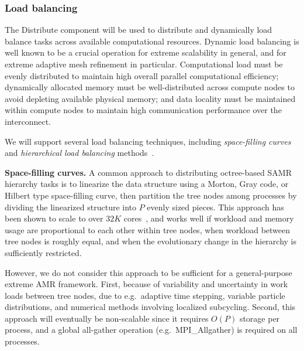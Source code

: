 \documentclass[11pt,letterpaper]{article}
\newcommand{\code}[1]{\textsf{#1}}
\begin{document}
\subsubsection{Load balancing} \label{sss:design-balance}

The \code{Distribute} component will be used to distribute and
dynamically load balance tasks across available computational
resources.  Dynamic load balancing is well known to be a crucial
operation for extreme scalability in general, and for extreme adaptive
mesh refinement in particular.  Computational load must be evenly
distributed to maintain high overall parallel computational
efficiency; dynamically allocated memory must be well-distributed
across compute nodes to avoid depleting available physical memory; and
data locality must be maintained within compute nodes to maintain high
communication performance over the interconnect.

We will support several load balancing techniques, including
\textit{space-filling curves} and \textit{hierarchical load balancing}
methods~\cite{LaTa06}.

\textbf{Space-filling curves.}  A common approach to
distributing octree-based SAMR hierarchy tasks is to linearize the
data structure using a Morton, Gray code, or Hilbert type
space-filling curve, then partition the tree nodes among processes by
dividing the linearized structure into $P$ evenly sized pieces.  This
approach has been shown to scale to over $32K$ cores~\cite{BuGh08},
and works well if workload and memory usage are proportional to each
other within tree nodes, when workload between tree nodes is roughly
equal, and when the evolutionary change in the hierarchy is
sufficiently restricted.

However, we do not consider this approach to be sufficient for a
general-purpose extreme AMR framework.  First, because of variability
and uncertainty in work loads between tree nodes, due to e.g.~adaptive
time stepping, variable particle distributions, and numerical methods
involving localized subcycling.
%
%
%
%
Second, this approach will eventually be non-scalable since it
requires $O(P)$ storage per process, and a global all-gather
operation (e.g.~\code{MPI\_Allgather}) is required on all processes.
\end{document}

